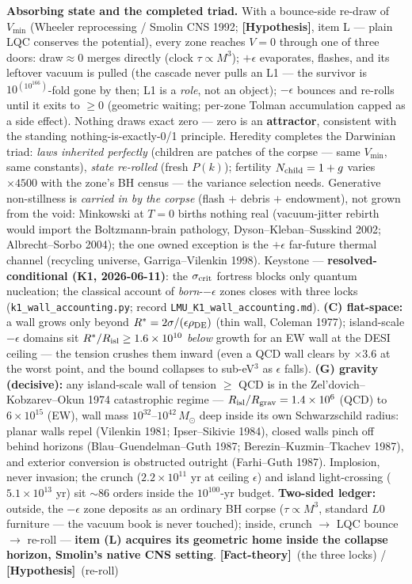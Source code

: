 \documentclass[11pt]{article}
\newcommand{\factth}{\textcolor{green!40!black}{\textbf{[Fact-theory]}}}
\newcommand{\hyp}{\textcolor{orange!80!black}{\textbf{[Hypothesis]}}}
\newcommand{\msun}{M_\odot}
\begin{document}
\textbf{Absorbing state and the completed triad.} With a bounce-side re-draw of $V_{\min}$ (Wheeler reprocessing / Smolin CNS 1992; \hyp, item L --- plain LQC conserves the potential), every zone reaches $V=0$ through one of three doors: draw$\approx$0 merges directly (clock $\tau\propto M^3$); $+\epsilon$ evaporates, flashes, and its leftover vacuum is pulled (the cascade never pulls an L1 --- the survivor is $10^{(10^{166})}$-fold gone by then; L1 is a \emph{role}, not an object); $-\epsilon$ bounces and re-rolls until it exits to $\ge0$ (geometric waiting; per-zone Tolman accumulation capped as a side effect). Nothing draws exact zero --- zero is an \textbf{attractor}, consistent with the standing nothing-is-exactly-0/1 principle. Heredity completes the Darwinian triad: \emph{laws inherited perfectly} (children are patches of the corpse --- same $V_{\min}$, same constants), \emph{state re-rolled} (fresh $P(k)$); fertility $N_{\rm child}=1+g$ varies $\times4500$ with the zone's BH census --- the variance selection needs. Generative non-stillness is \emph{carried in by the corpse} (flash $+$ debris $+$ endowment), not grown from the void: Minkowski at $T=0$ births nothing real (vacuum-jitter rebirth would import the Boltzmann-brain pathology, Dyson--Kleban--Susskind 2002; Albrecht--Sorbo 2004); the one owned exception is the $+\epsilon$ far-future thermal channel (recycling universe, Garriga--Vilenkin 1998). Keystone --- \textbf{resolved-conditional (K1, 2026-06-11)}: the $\sigma_{\rm crit}$ fortress blocks only quantum nucleation; the classical account of \emph{born}-$-\epsilon$ zones closes with three locks (\texttt{k1\_wall\_accounting.py}; record \texttt{LMU\_K1\_wall\_accounting.md}). \textbf{(C) flat-space:} a wall grows only beyond $R^*=2\sigma/(\epsilon\rho_{\rm DE})$ (thin wall, Coleman 1977); island-scale $-\epsilon$ domains sit $R^*/R_{\rm isl}\ge1.6\times10^{10}$ \emph{below} growth for an EW wall at the DESI ceiling --- the tension crushes them inward (even a QCD wall clears by $\times3.6$ at the worst point, and the bound collapses to sub-eV$^3$ as $\epsilon$ falls). \textbf{(G) gravity (decisive):} any island-scale wall of tension $\ge$ QCD is in the Zel'dovich--Kobzarev--Okun 1974 catastrophic regime --- $R_{\rm isl}/R_{\rm grav}=1.4\times10^{6}$ (QCD) to $6\times10^{15}$ (EW), wall mass $10^{32}$--$10^{42}\,\msun$ deep inside its own Schwarzschild radius: planar walls repel (Vilenkin 1981; Ipser--Sikivie 1984), closed walls pinch off behind horizons (Blau--Guendelman--Guth 1987; Berezin--Kuzmin--Tkachev 1987), and exterior conversion is obstructed outright (Farhi--Guth 1987). Implosion, never invasion; the crunch ($2.2\times10^{11}$ yr at ceiling $\epsilon$) and island light-crossing ($5.1\times10^{13}$ yr) sit $\sim$86 orders inside the $10^{100}$-yr budget. \textbf{Two-sided ledger:} outside, the $-\epsilon$ zone deposits as an ordinary BH corpse ($\tau\propto M^3$, standard $L0$ furniture --- the vacuum book is never touched); inside, crunch $\to$ LQC bounce $\to$ re-roll --- \textbf{item (L) acquires its geometric home inside the collapse horizon, Smolin's native CNS setting}. \factth\ (the three locks) / \hyp\ (re-roll)
\end{document}
